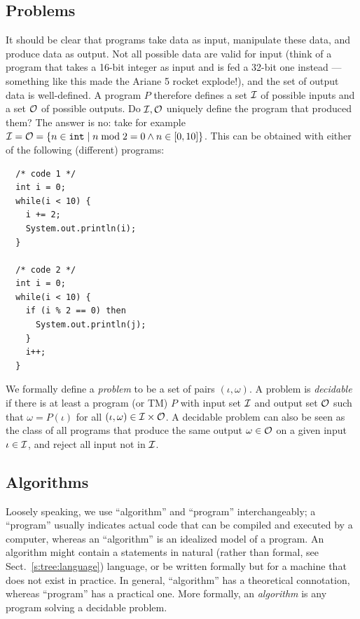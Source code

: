 \documentclass[a4paper]{book}
\theoremstyle{changebreak}                %
\begin{document}
\subsection{Problems}
\label{s:computation:problem}
It should be clear that programs take data as input, manipulate these
data, and produce data as output. Not all possible data are valid for
input (think of a program that takes a 16-bit integer as input and is
fed a 32-bit one instead --- something like this made the Ariane 5
rocket explode!), and the set of output data is well-defined. A
program $P$ therefore defines a set ${\cal I}$ of possible inputs and
a set ${\cal O}$ of possible outputs. Do ${\cal I},{\cal O}$ uniquely
define the program that produced them? The answer is no: take for
example ${\cal I}={\cal O}=\{n\in\mbox{\tt int}\;|\;n\bmod 2=0\land
n\in[0,10]\}$. This can be obtained with either of the following
(different) programs:
\begin{verbatim}
  /* code 1 */
  int i = 0;
  while(i < 10) {
    i += 2;
    System.out.println(i);
  }

  /* code 2 */
  int i = 0;
  while(i < 10) {
    if (i % 2 == 0) then
      System.out.println(j);
    }
    i++;
  }
\end{verbatim}

We formally define a {\it problem} to be a set of pairs
$(\iota,\omega)$. A problem is {\it
  decidable} if there is at
least a program (or TM) $P$ with input set ${\cal I}$ and output set
${\cal O}$ such that $\omega=P(\iota)$ for all $(\iota,\omega)\in
{\cal I}\times {\cal O}$. A decidable problem can also be seen as the class
of all programs that produce the same output $\omega\in {\cal O}$ on a
given input $\iota\in {\cal I}$, and reject all input not in ${\cal
  I}$.

\subsection{Algorithms}
\label{s:computation:algorithm}
Loosely speaking, we use ``algorithm'' and ``program''
interchangeably; a ``program'' usually indicates actual code that can
be compiled and executed by a computer, whereas an ``algorithm'' is an
idealized model of a program. An algorithm might contain a statements
in natural (rather than formal, see Sect.~\ref{s:tree:language})
language, or be written formally but for a machine that does not exist
in practice. In general, ``algorithm'' has a theoretical connotation,
whereas ``program'' has a practical one. More formally, an {\it
  algorithm} is any program solving a decidable
problem.
\end{document}
